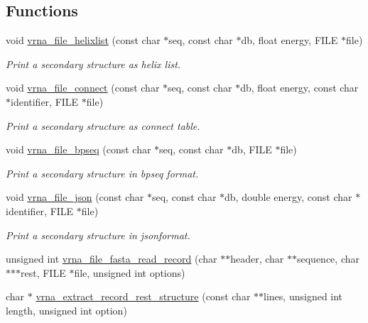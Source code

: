 \subsection*{Functions}
\begin{DoxyCompactItemize}
\item 
void \mbox{\hyperlink{group__file__formats_gaaface7db12fadc3d271641c4515ab6e4}{vrna\+\_\+file\+\_\+helixlist}} (const char $\ast$seq, const char $\ast$db, float energy, F\+I\+LE $\ast$file)
\begin{DoxyCompactList}\small\item\em Print a secondary structure as helix list. \end{DoxyCompactList}\item 
void \mbox{\hyperlink{group__file__formats_gab69682373ccca1e0e28cc967eec07745}{vrna\+\_\+file\+\_\+connect}} (const char $\ast$seq, const char $\ast$db, float energy, const char $\ast$identifier, F\+I\+LE $\ast$file)
\begin{DoxyCompactList}\small\item\em Print a secondary structure as connect table. \end{DoxyCompactList}\item 
void \mbox{\hyperlink{group__file__formats_ga9b462e6f202594af5d3fa56e280d633f}{vrna\+\_\+file\+\_\+bpseq}} (const char $\ast$seq, const char $\ast$db, F\+I\+LE $\ast$file)
\begin{DoxyCompactList}\small\item\em Print a secondary structure in bpseq format. \end{DoxyCompactList}\item 
void \mbox{\hyperlink{group__file__formats_ga31f4a6c2ea1495a6e4f9eb45a9f6193d}{vrna\+\_\+file\+\_\+json}} (const char $\ast$seq, const char $\ast$db, double energy, const char $\ast$identifier, F\+I\+LE $\ast$file)
\begin{DoxyCompactList}\small\item\em Print a secondary structure in jsonformat. \end{DoxyCompactList}\item 
unsigned int \mbox{\hyperlink{group__file__formats_ga8cfb7e271efc9e1f34640acb85475639}{vrna\+\_\+file\+\_\+fasta\+\_\+read\+\_\+record}} (char $\ast$$\ast$header, char $\ast$$\ast$sequence, char $\ast$$\ast$$\ast$rest, F\+I\+LE $\ast$file, unsigned int options)
\item 
char $\ast$ \mbox{\hyperlink{group__file__formats_gad37cbb63a05eed63ba25c91628409be0}{vrna\+\_\+extract\+\_\+record\+\_\+rest\+\_\+structure}} (const char $\ast$$\ast$lines, unsigned int length, unsigned int option)
$$
\end{DoxyCompactItemize}
